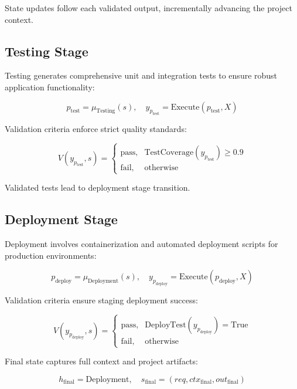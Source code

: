 \documentclass[11pt,a4paper]{article}
\begin{document}
State updates follow each validated output, incrementally advancing the project context.

\subsection{Testing Stage}
\label{subsec:testing_stage}

Testing generates comprehensive unit and integration tests to ensure robust application functionality:

\[
p_{\text{test}} = \mu_{\text{Testing}}(s),\quad y_{p_{\text{test}}}=\text{Execute}(p_{\text{test}},X)
\]

Validation criteria enforce strict quality standards:

\[
V(y_{p_{\text{test}}}, s)=
\begin{cases}
    \text{pass}, & \text{TestCoverage}(y_{p_{\text{test}}})\geq 0.9\\[4pt]
    \text{fail}, & \text{otherwise}
\end{cases}
\]

Validated tests lead to deployment stage transition.

\subsection{Deployment Stage}
\label{subsec:deployment_stage}

Deployment involves containerization and automated deployment scripts for production environments:

\[
p_{\text{deploy}}=\mu_{\text{Deployment}}(s),\quad y_{p_{\text{deploy}}}=\text{Execute}(p_{\text{deploy}},X)
\]

Validation criteria ensure staging deployment success:

\[
V(y_{p_{\text{deploy}}}, s)=
\begin{cases}
    \text{pass}, & \text{DeployTest}(y_{p_{\text{deploy}}})=\text{True}\\[4pt]
    \text{fail}, & \text{otherwise}
\end{cases}
\]

Final state captures full context and project artifacts:

\[
h_{\text{final}}=\text{Deployment},\quad s_{\text{final}}=(req,ctx_{\text{final}},out_{\text{final}})
\]
\end{document}
